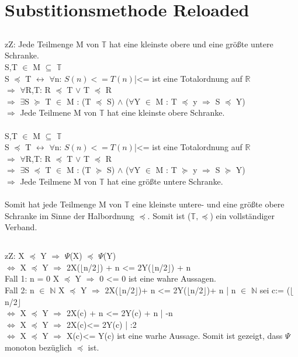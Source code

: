 \section{Substitionsmethode Reloaded}
\subsection{}
zZ: Jede Teilmenge M von $\mathbb{T}$ hat eine kleinste obere und eine größte untere Schranke. \\
S,T $\in$ M $\subseteq $ $\mathbb{T}$ \\
S $\preceq$ T $\leftrightarrow$ $\forall$n: $S(n)<=T(n)$|<= ist eine Totalordnung auf $\mathbb{R}$ \\
$\Rightarrow$ $\forall$R,T: R $\preceq$ T $\lor$ T $\preceq$ R \\
$\Rightarrow$ $\exists$S $\succeq$ T $\in$ M : (T $\preceq$ S) $\land$ ($\forall$Y $\in$ M : T $\preceq$ y $\Rightarrow$ S $\preceq$ Y) \\
$\Rightarrow$ Jede Teilmene M von $\mathbb{T}$ hat eine kleinste obere Schranke. \\ \\S,T $\in$ M $\subseteq $ $\mathbb{T}$ \\
S $\preceq$ T $\leftrightarrow$ $\forall$n: $S(n)<=T(n)$|<= ist eine Totalordnung auf $\mathbb{R}$ \\
$\Rightarrow$ $\forall$R,T: R $\preceq$ T $\lor$ T $\preceq$ R \\
$\Rightarrow$ $\exists$S $\preceq$ T $\in$ M : (T $\succeq$ S) $\land$ ($\forall$Y $\in$ M : T $\succeq$ y $\Rightarrow$ S $\succeq$ Y) \\
$\Rightarrow$ Jede Teilmene M von $\mathbb{T}$ hat eine größte untere Schranke. \\ \\
Somit hat jede Teilmenge M von $\mathbb{T}$ eine kleinste untere- und eine größte obere Schranke im Sinne der Halbordnung $\preceq$. Somit ist ($\mathbb{T},\preceq$) ein vollständiger Verband.
\subsection{}
zZ: X $\preceq$ Y $\Rightarrow$ $\Psi$(X) $\preceq$ $\Psi$(Y) \\
$\Leftrightarrow$ X $\preceq$ Y $\Rightarrow$ 2X($\lfloor$n/2$\rfloor$) + n <= 2Y($\lfloor$n/2$\rfloor$) + n \\
Fall 1: n = 0 X $\preceq$ Y $\Rightarrow$ 0 <= 0 ist eine wahre Aussagen. \\
Fall 2: n $\in$ $\mathbb{N}$ X $\preceq$ Y $\Rightarrow$ 2X($\lfloor$n/2$\rfloor$)+ n <= 2Y($\lfloor$n/2$\rfloor$)+ n | n $\in$ $\mathbb{N}$ sei c:= ($\lfloor$n/2$\rfloor$ \\
$\Leftrightarrow$ X $\preceq$ Y $\Rightarrow$ 2X(c) + n <= 2Y(c) + n | -n \\
$\Leftrightarrow$ X $\preceq$ Y $\Rightarrow$ 2X(c)<= 2Y(c) | :2 \\
$\Leftrightarrow$ X $\preceq$ Y $\Rightarrow$ X(c)<= Y(c) ist eine warhe Aussage. Somit ist gezeigt, dass $\Psi$ monoton bezüglich $\preceq$ ist.
